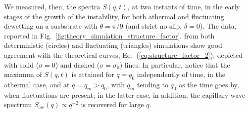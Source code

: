 We measured, then, the spectra $S(q,t)$, at two instants of time, in the early stages of the growth of the instability, for both athermal and fluctuating dewetting on a susbstrate with $\theta=\pi/9$ (and strict no-slip, $\delta=0$).
The data, reported in Fig.~\ref{fig:theory_simulation_structure_factor}, from both deterministic (circles) and fluctuating (triangles) simulations show good agreement with the theoretical curves, Eq.~(\ref{eq:structure_factor_2}), depicted with solid ($\sigma=0$) and dashed ($\sigma=\sigma_0$) lines.
In particular, notice that the maximum  of $S(q,t)$ is attained for $q=q_0$ independently of time, in the athermal case, and at $q = q_m > q_0$, with $q_m$ tending to $q_0$ as the time goes by, when fluctuations are present; in the latter case, in addition, the capillary wave spectrum $S_{\text{cw}}(q) \propto q^{-2}$ is recovered for large $q$.

